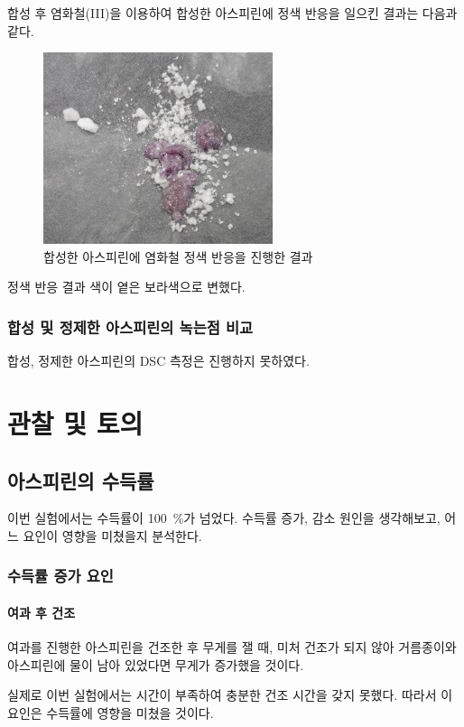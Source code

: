 \documentclass{GSHS-chemexp}
\begin{document}
	합성 후 염화철(III)을 이용하여 합성한 아스피린에 정색 반응을 일으킨 결과는
	다음과 같다.
	\begin{figure}[H]
		\centering
		\includegraphics[scale=1]{noname03.jpg}
		\caption{합성한 아스피린에 염화철 정색 반응을 진행한 결과}
		\label{fig:fe3_2}
	\end{figure}
	
	정색 반응 결과 색이 옅은 보라색으로 변했다.
	
	\subsubsection{합성 및 정제한 아스피린의 녹는점 비교}
	합성, 정제한 아스피린의 DSC 측정은 진행하지 못하였다.
	
	\section{관찰 및 토의}
	
	\subsection{아스피린의 수득률}
	이번 실험에서는 수득률이 \SI{100}{\percent}가 넘었다.
	수득률 증가, 감소 원인을 생각해보고, 어느 요인이 영향을 미쳤을지 분석한다.
	
	\subsubsection{수득률 증가 요인}
	
	\paragraph{여과 후 건조}
	여과를 진행한 아스피린을 건조한 후 무게를 잴 때, 미처 건조가 되지 않아
	거름종이와 아스피린에 물이 남아 있었다면 무게가 증가했을 것이다.
	
	실제로 이번 실험에서는 시간이 부족하여 충분한 건조 시간을 갖지 못했다.
	따라서 이 요인은 수득률에 영향을 미쳤을 것이다.
	
\end{document}
